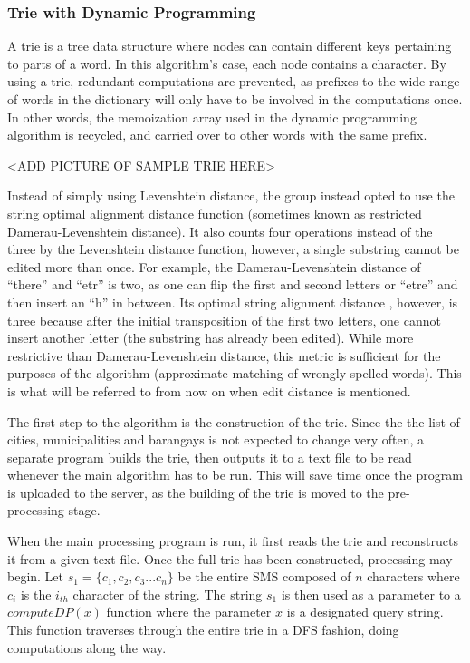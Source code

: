 \documentclass{acm_proc_article-sp}
\begin{document}
\subsubsection{Trie with Dynamic Programming}
\label{trie}
A trie is a tree data structure where nodes can contain different keys pertaining to parts of a word. In this algorithm's case, each node contains a character. By using a trie, redundant computations are prevented, as prefixes to the wide range of words in the dictionary will only have to be involved in the computations once. In other words, the memoization array used in the dynamic programming algorithm is recycled, and carried over to other words with the same prefix.

<ADD PICTURE OF SAMPLE TRIE HERE> 

Instead of simply using Levenshtein distance, the group instead opted to use the string optimal alignment distance function (sometimes known as restricted Damerau-Levenshtein distance). It also counts four operations instead of the three by the Levenshtein distance function, however, a single substring cannot be edited more than once. For example, the Damerau-Levenshtein distance of ``there'' and ``etr'' is two, as one can flip the first and second letters or ``etre'' and then insert an ``h'' in between. Its optimal string alignment distance , however, is three because after the initial transposition of the first two letters, one cannot insert another letter (the substring has already been edited). While more restrictive than Damerau-Levenshtein distance, this metric is sufficient for the purposes of the algorithm (approximate matching of wrongly spelled words). This is what will be referred to from now on when edit distance is mentioned. 

The first step to the algorithm is the construction of the trie. Since the the list of cities, municipalities and barangays is not expected to change very often, a separate program builds the trie, then outputs it to a text file to be read whenever the main algorithm has to be run. This will save time once the program is uploaded to the server, as  the building of the trie is moved to the pre-processing stage.

When the main processing program is run, it first reads the trie and reconstructs it from a given text file. Once the full trie has been constructed, processing may begin. Let $s_1 = \{c_1,c_2,c_3 . . . c_n\}$ be the entire SMS composed of $n$ characters where $c_i$ is the $i_{th}$ character of the string. The string $s_1$ is then used as a parameter to a $computeDP(x)$ function where the parameter $x$ is a designated query string. This function traverses through the entire trie in a DFS fashion, doing computations along the way. 
 
\end{document}
